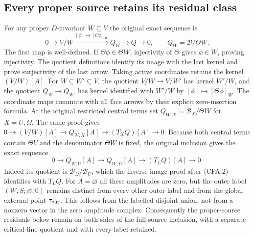 \subsection{Every proper source retains its residual class}

For any proper $D$-invariant $W\subseteq V$ the original exact
sequence is
\[
 0\to V/W\xrightarrow{[\phi]\mapsto[\Theta\phi]_W}
       Q_W\longrightarrow Q\to0,\qquad Q_W=\mathscr B/\Theta W.
                                                               \tag{CFA.23}
\]
The first map is well-defined.  If $\Theta\phi\in\Theta W$,
injectivity of $\Theta$ gives $\phi\in W$, proving injectivity.
The quotient definitions identify its image with the last kernel
and prove surjectivity of the last arrow.  Taking active coordinates
retains the kernel $(V/W)[A]$.  For $W\subseteq W'\subseteq V$,
the quotient $V/W\to V/W'$ has kernel $W'/W$, and the quotient
$Q_W\to Q_{W'}$ has kernel identified with $W'/W$ by
$[\phi]\mapsto[\Theta\phi]_W$.  The coordinate maps commute with
all face arrows by their explicit zero-insertion formula.
At the original restricted central terms set
$Q_{W,X}=\mathscr B_X/\Theta W$ for $X=U,\Omega$. The same
proof gives $0\to(V/W)[A]\to Q_{W,X}[A]\to(T_XQ)[A]\to0$.
Because both central terms contain $\Theta V$ and the denominator
$\Theta W$ is fixed, the original inclusion gives the exact sequence
\[
 0\to Q_{W,U}[A]\to Q_{W,\Omega}[A]\to(T_LQ)[A]\to0.
                                                               \tag{CFA.23a}
\]
Indeed its quotient is $\mathscr B_\Omega/\mathscr B_U$, which
the inverse-image proof after (CFA.2) identifies with $T_LQ$.
For $A=\varnothing$ all these amplitudes are zero, but the outer
label $(W,S;\varnothing,0)$ remains distinct from every other
outer label and from the global external point $\tau_{\rm out}$.
This follows from the labelled disjoint union, not from a nonzero
vector in the zero amplitude complex. Consequently the proper-source
residuals below remain on both sides of the full source inclusion,
with a separate critical-line quotient and with every label retained.

